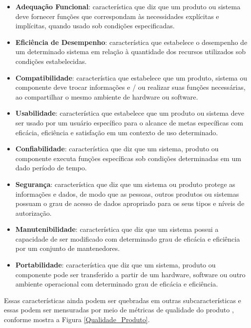 \begin{itemize}

\item \textbf{Adequação Funcional}: característica que diz que um produto ou sistema deve fornecer funções que correspondam às necessidades explícitas e implícitas, quando usado sob condições especificadas.


\item \textbf{Eficiência de Desempenho}: característica que estabelece o desempenho de um determinado sistema em relação à quantidade dos recursos utilizados sob condições estabelecidas.

\item \textbf{Compatibilidade}: característica que estabelece que um produto, sistema ou componente deve trocar informações e / ou realizar suas funções necessárias, ao compartilhar o mesmo ambiente de hardware ou software.


\item \textbf{Usabilidade}: característica que estabelece que um produto ou sistema deve ser usado por um usuário específico para o alcance de metas específicas com eficácia, eficiência e satisfação em um contexto de uso determinado.

\item \textbf{Confiabilidade}: característica que diz que um sistema, produto ou componente executa funções específicas sob condições determinadas em um dado período de tempo.

\item \textbf{Segurança}: característica que diz que um sistema ou produto protege as informações e dados, de modo que as pessoas, outros produtos ou sistemas possuam o grau de acesso de dados apropriado para os seus tipos e níveis de autorização.

\item \textbf{Manutenibilidade}: característica que diz que um sistema possui a capacidade de ser modificado com determinado grau de eficácia e eficiência por um conjunto de mantenedores.

\item \textbf{Portabilidade}: característica que diz que um sistema, produto ou componente pode ser transferido a partir de um hardware, software ou outro ambiente operacional com determinado grau de eficácia e eficiência.


\end{itemize}

Essas características ainda podem ser quebradas em outras subcaracterísticas e essas podem ser mensuradas por meio de métricas de qualidade do produto , conforme mostra a Figura \ref{Qualidade_Produto}.

